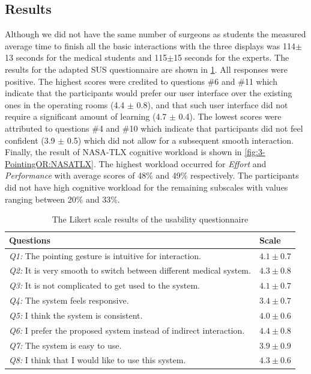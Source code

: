 {\subsection{Results}
Although we did not have the same number of surgeons as students the measured average time to finish all the basic interactions with the three displays was 114$\pm$13 seconds for the medical students and 115$\pm$15 seconds for the experts. 
The results for the adapted SUS questionnaire are shown in \tablename{\ref{tb:3-PointingOR:questionnaire}}.
All responses were positive. The highest scores were credited to questions \#6 and \#11 which indicate that the participants would prefer our user interface over the existing ones in the operating rooms (4.4 $\pm$ 0.8), and that such user interface did not require a significant amount of learning (4.7 $\pm$ 0.4). The lowest scores were attributed to questions \#4 and \#10 which indicate that participants did not feel confident (3.9 $\pm$ 0.5) which did not allow for a subsequent smooth interaction. Finally, the result of NASA-TLX cognitive workload is shown in \figurename{\ref{fig:3-PointingOR:NASATLX}}. The highest workload occurred for \textit{Effort} and \textit{Performance} with average scores of 48\% and 49\% respectively. The participants did not have high cognitive workload for the remaining subscales with values ranging between 20\% and 33\%.
\begin{table}
	\caption{The Likert scale results of the usability questionnaire}
	\label{tb:3-PointingOR:questionnaire}
	\scriptsize
	\begin{center}
		\begin{tabular}{p{8cm}|p{1.2cm}}
			Questions & Scale \\
			\hline
			\textit{Q1:} The pointing gesture is intuitive for interaction. &  $4.1\pm0.7$ \\
			\textit{Q2:} It is very smooth to switch between different medical system. & $4.3\pm0.8$ \\
			\textit{Q3:} It is not complicated to get used to the system. & $4.1\pm0.7$ \\
			\textit{Q4:} The system feels responsive. & $3.4\pm0.7$\\
			\textit{Q5:} I  think the system is consistent. & $4.0\pm0.6$ \\
			\textit{Q6:} I prefer the proposed system instead of indirect interaction. & $4.4\pm0.8$ \\
			\textit{Q7:} The system is easy to use.& $3.9\pm0.9$ \\
			\textit{Q8:} I think that I would like to use this system. & $4.3\pm0.6$ \\

\end{tabular}
\end{center}
\end{table}}

